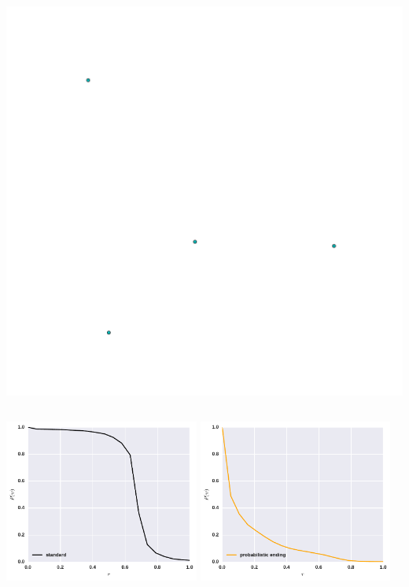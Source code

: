 \documentclass{beamer}
\begin{document}
\begin{frame}
\begin{columns}[T]
\begin{column}{.6\textwidth}
       \vspace{-3cm} 
       \hspace{-2cm} \includegraphics[width=\textwidth]{static/diamond.png}
    \end{column}
\end{columns}
\end{frame}

\begin{frame}
\begin{center}
    \includegraphics[width=0.48\textwidth]{static/standard.pdf}
    \hfill
    \includegraphics[width=0.48\textwidth]{static/probend.pdf}
\end{center}
\end{frame}
\end{document}
